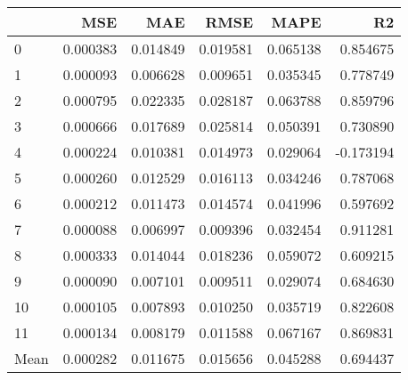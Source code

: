 \begin{tabular}{lrrrrr}
\toprule
 & MSE & MAE & RMSE & MAPE & R2 \\
\midrule
0 & 0.000383 & 0.014849 & 0.019581 & 0.065138 & 0.854675 \\
1 & 0.000093 & 0.006628 & 0.009651 & 0.035345 & 0.778749 \\
2 & 0.000795 & 0.022335 & 0.028187 & 0.063788 & 0.859796 \\
3 & 0.000666 & 0.017689 & 0.025814 & 0.050391 & 0.730890 \\
4 & 0.000224 & 0.010381 & 0.014973 & 0.029064 & -0.173194 \\
5 & 0.000260 & 0.012529 & 0.016113 & 0.034246 & 0.787068 \\
6 & 0.000212 & 0.011473 & 0.014574 & 0.041996 & 0.597692 \\
7 & 0.000088 & 0.006997 & 0.009396 & 0.032454 & 0.911281 \\
8 & 0.000333 & 0.014044 & 0.018236 & 0.059072 & 0.609215 \\
9 & 0.000090 & 0.007101 & 0.009511 & 0.029074 & 0.684630 \\
10 & 0.000105 & 0.007893 & 0.010250 & 0.035719 & 0.822608 \\
11 & 0.000134 & 0.008179 & 0.011588 & 0.067167 & 0.869831 \\
Mean & 0.000282 & 0.011675 & 0.015656 & 0.045288 & 0.694437 \\
\bottomrule
\end{tabular}
